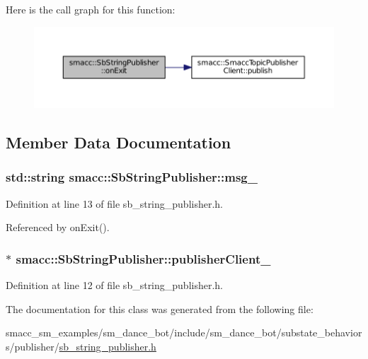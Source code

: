 Here is the call graph for this function\+:
\nopagebreak
\begin{figure}[H]
\begin{center}
\leavevmode
\includegraphics[width=350pt]{classsmacc_1_1SbStringPublisher_a0f39847ddaf8ffc90c31a267b67cd005_cgraph}
\end{center}
\end{figure}




\subsection{Member Data Documentation}
\subsubsection[{\texorpdfstring{msg\+\_\+}{msg_}}]{\setlength{\rightskip}{0pt plus 5cm}std\+::string smacc\+::\+Sb\+String\+Publisher\+::msg\+\_\+}\hypertarget{classsmacc_1_1SbStringPublisher_ad3397fa2bb3097192c3f82d243704741}{}\label{classsmacc_1_1SbStringPublisher_ad3397fa2bb3097192c3f82d243704741}


Definition at line 13 of file sb\+\_\+string\+\_\+publisher.\+h.



Referenced by on\+Exit().

\subsubsection[{\texorpdfstring{publisher\+Client\+\_\+}{publisherClient_}}]{$\ast$ smacc\+::\+Sb\+String\+Publisher\+::publisher\+Client\+\_\+}\hypertarget{classsmacc_1_1SbStringPublisher_a447bf4a72903d9bf0ed7583dee3d09b2}{}\label{classsmacc_1_1SbStringPublisher_a447bf4a72903d9bf0ed7583dee3d09b2}


Definition at line 12 of file sb\+\_\+string\+\_\+publisher.\+h.



The documentation for this class was generated from the following file\+:\begin{DoxyCompactItemize}
\item 
smacc\+\_\+sm\+\_\+examples/sm\+\_\+dance\+\_\+bot/include/sm\+\_\+dance\+\_\+bot/substate\+\_\+behaviors/publisher/\hyperlink{sb__string__publisher_8h}{sb\+\_\+string\+\_\+publisher.\+h}\end{DoxyCompactItemize}
